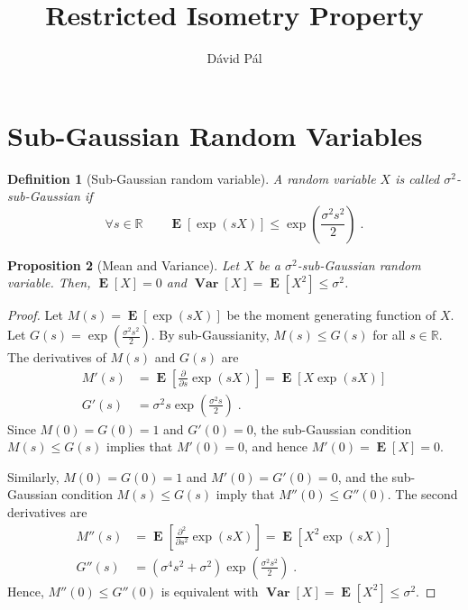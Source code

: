 \documentclass[12pt]{article}
\newtheorem{definition}{Definition}
\newtheorem{proposition}[definition]{Proposition}
\newcommand{\R}{\mathbb{R}}
\DeclareMathOperator*{\Var}{\mathbf{Var}}
\DeclareMathOperator*{\Exp}{\mathbf{E}}
\begin{document}
\title{Restricted Isometry Property}
\author{D\'avid P\'al}
\maketitle

\section{Sub-Gaussian Random Variables}

\begin{definition}[Sub-Gaussian random variable]
A random variable $X$ is called \emph{$\sigma^2$-sub-Gaussian} if
$$
\forall s \in \R \qquad
\Exp\left[ \exp \left( s X \right) \right]
\le \exp\left( \frac{\sigma^2 s^2}{2} \right) \; .
$$
\end{definition}

\begin{proposition}[Mean and Variance]
\label{proposition:sub-gaussian-mean-and-variance}
Let $X$ be a $\sigma^2$-sub-Gaussian random variable.
Then, $\Exp[X] = 0$ and $\Var[X] = \Exp[X^2] \le \sigma^2$.
\end{proposition}

\begin{proof}
Let $M(s) = \Exp[\exp(sX)]$ be the moment generating function of $X$.
Let $G(s) = \exp\left( \frac{\sigma^2 s^2}{2} \right)$.
By sub-Gaussianity, $M(s) \le G(s)$ for all $s \in \R$.
The derivatives of $M(s)$ and $G(s)$ are
\begin{align*}
M'(s) & = \Exp\left[ \frac{\partial}{\partial s}  \exp(sX) \right] = \Exp[X \exp(sX)] \\
G'(s) & = \sigma^2 s \exp\left( \frac{\sigma^2 s}{2} \right) \; .
\end{align*}
Since $M(0) = G(0) = 1$ and $G'(0) = 0$, the sub-Gaussian condition $M(s) \le G(s)$
implies that $M'(0) = 0$, and hence $M'(0) = \Exp[X] = 0$.

Similarly, $M(0) = G(0) = 1$ and $M'(0) = G'(0) = 0$, and the sub-Gaussian condition $M(s) \le G(s)$
imply that $M''(0) \le G''(0)$. The second derivatives are
\begin{align*}
M''(s) & = \Exp\left[ \frac{\partial^2}{\partial s^2}  \exp(sX) \right] = \Exp[X^2 \exp(sX)] \\
G''(s) & = (\sigma^4 s^2 + \sigma^2) \exp \left( \frac{\sigma^2 s^2}{2} \right) \; .
\end{align*}
Hence, $M''(0) \le G''(0)$ is equivalent with $\Var[X] = \Exp[X^2] \le \sigma^2$.
\end{proof}
\end{document}
